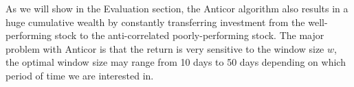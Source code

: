 As we will show in the Evaluation section, the Anticor algorithm also results in a huge cumulative wealth by constantly transferring investment from the well-performing stock to the anti-correlated poorly-performing stock. The major problem with Anticor is that the return is very sensitive to the window size $w$, the optimal window size may range from 10 days to 50 days depending on which period of time we are interested in.

